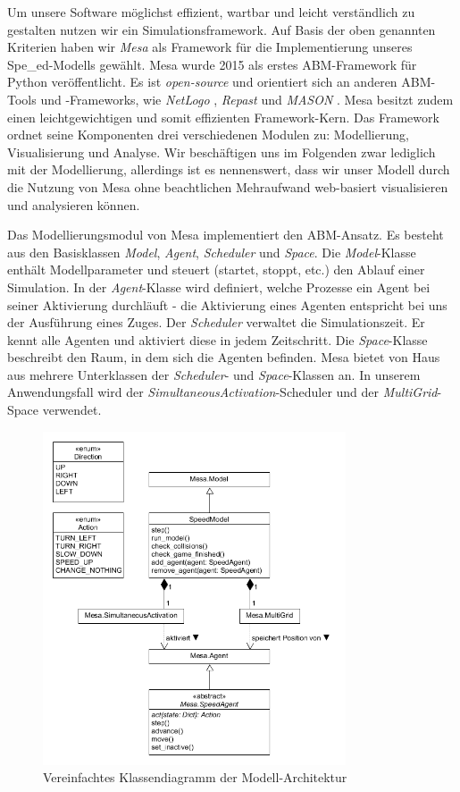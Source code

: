Um unsere Software möglichst effizient, wartbar und leicht verständlich zu gestalten nutzen wir ein Simulationsframework. Auf Basis der oben genannten Kriterien haben wir \textit{Mesa} \cite{Masad.2015} als Framework für die Implementierung unseres Spe\_ed-Modells gewählt. Mesa wurde 2015 als erstes \acrshort{ABM}-Framework für Python veröffentlicht. Es ist \textit{open-source} und orientiert sich an anderen \acrshort{ABM}-Tools und -Frameworks, wie \textit{NetLogo} \cite{Wilensky.2004}, \textit{Repast} \cite{North.2013} und \textit{MASON} \cite{Luke.2005}. Mesa besitzt zudem einen leichtgewichtigen und somit effizienten Framework-Kern. Das Framework ordnet seine Komponenten drei verschiedenen Modulen zu: Modellierung, Visualisierung und Analyse. Wir beschäftigen uns im Folgenden zwar lediglich mit der Modellierung, allerdings ist es nennenswert, dass wir unser Modell durch die Nutzung von Mesa ohne beachtlichen Mehraufwand web-basiert visualisieren und analysieren können.

Das Modellierungsmodul von Mesa implementiert den \acrshort{ABM}-Ansatz. Es besteht aus den Basisklassen \textit{Model}, \textit{Agent}, \textit{Scheduler} und \textit{Space}. Die \textit{Model}-Klasse enthält Modellparameter und steuert (startet, stoppt, etc.) den Ablauf einer Simulation. In der \textit{Agent}-Klasse wird definiert, welche Prozesse ein Agent bei seiner Aktivierung durchläuft - die Aktivierung eines Agenten entspricht bei uns der Ausführung eines Zuges. Der \textit{Scheduler} verwaltet die Simulationszeit. Er kennt alle Agenten und aktiviert diese in jedem Zeitschritt. Die \textit{Space}-Klasse beschreibt den Raum, in dem sich die Agenten befinden. Mesa bietet von Haus aus mehrere Unterklassen der \textit{Scheduler}- und \textit{Space}-Klassen an. In unserem Anwendungsfall wird der \textit{SimultaneousActivation}-Scheduler und der \textit{MultiGrid}-Space verwendet.

\begin{figure}[ht]
    \centering
    \includegraphics[width=0.8\textwidth]{img/model.png}
    \caption{Vereinfachtes Klassendiagramm der Modell-Architektur}
	\label{fig:model}
\end{figure}


